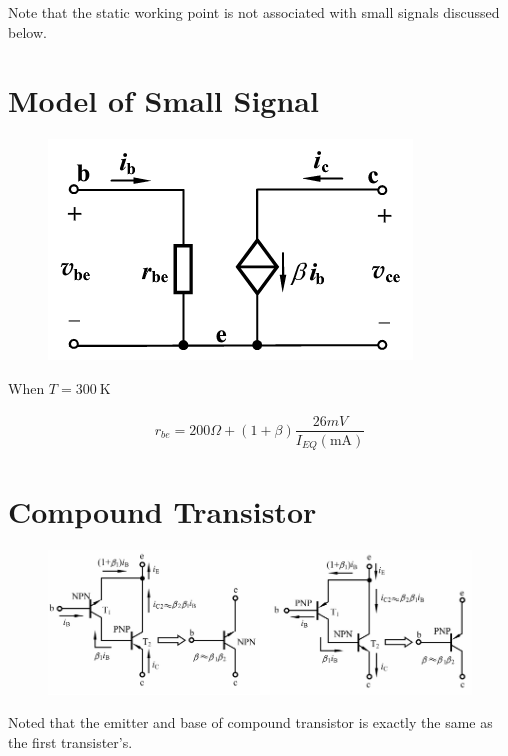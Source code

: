 Note that the static working point is not associated with small signals discussed below.

\section{Model of Small Signal}

\begin{figure}[H]
  \centering
  \includegraphics[width=0.7\linewidth]{figures/BJT-small-signal}
\end{figure}

When $T = 300 \  \mathrm{K}$

\begin{equation*}
  \begin{aligned}
    r_{be} = 200 \si{\Omega} + \left( 1 + \beta \right) \dfrac{26 \si{mV}}{I_{EQ} \left( \mathrm{mA} \right)} 
  \end{aligned}
\end{equation*}

\section{Compound Transistor}

\begin{figure}[H]
  \centering
  \includegraphics[width=\linewidth]{figures/BJT-compound}
\end{figure}

Noted that the emitter and base of compound transistor is exactly the same as the first transister's.

